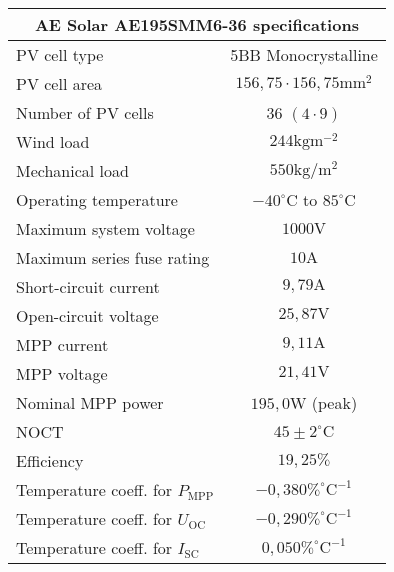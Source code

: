 \footnotesize
\begin{tabular}{|l|c|}
	\hline
	\multicolumn{2}{|c|}{\textbf{AE Solar AE195SMM6-36 specifications}} \\
	\hline
	PV cell type & 5BB Monocrystalline \\
	PV cell area & $156,75 \cdot 156,75\mathrm{mm}^2$ \\
	Number of PV cells & $36$ $(4 \cdot 9)$ \\
	Wind load & $244\mathrm{kg}\mathrm{m}^{-2}$ \\
	Mechanical load & $550\mathrm{kg}/\mathrm{m}^2$ \\
	Operating temperature & $-40^\circ \mathrm{C}$ to $85^\circ \mathrm{C}$ \\
	\hline
 	Maximum system voltage & $1000\mathrm{V}$ \\
	Maximum series fuse rating & $10\mathrm{A}$ \\
	Short-circuit current & $9,79\mathrm{A}$ \\
	Open-circuit voltage & $25,87\mathrm{V}$ \\
	MPP current & $9,11\mathrm{A}$ \\
	MPP voltage & $21,41\mathrm{V}$ \\
	Nominal MPP power & $195,0\mathrm{W}$ (peak) \\
	NOCT & $45\pm2 ^\circ \mathrm{C}$ \\
	Efficiency & $19,25\%$ \\
	\hline
	Temperature coeff. for $P_{\mathrm{MPP}}$ & $-0,380 \%^\circ \mathrm{C}^{-1}$ \\
	Temperature coeff. for $U_{\mathrm{OC}}$ & $-0,290 \%^\circ \mathrm{C}^{-1}$ \\
	Temperature coeff. for $I_{\mathrm{SC}}$ & $0,050 \%^\circ \mathrm{C}^{-1}$ \\
	\hline
\end{tabular}
